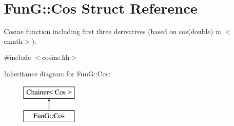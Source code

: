 \hypertarget{structFunG_1_1Cos}{}\section{FunG\+:\+:Cos Struct Reference}
\label{structFunG_1_1Cos}


Cosine function including first three derivatives (based on cos(double) in $<$cmath$>$).  




{\ttfamily \#include $<$cosine.\+hh$>$}

Inheritance diagram for FunG\+:\+:Cos\+:\begin{figure}[H]
\begin{center}
\leavevmode
\includegraphics[height=2.000000cm]{structFunG_1_1Cos}
\end{center}
\end{figure}
